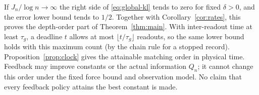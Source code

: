 If $J_n/\log n\to\infty$ the right side of \eqref{eq:global-kl} tends to zero
for fixed $\delta>0$, and the error lower bound tends to $1/2$. Together with
Corollary~\ref{cor:rates}, this proves the depth-order part of
Theorem~\ref{thm:main}. With inter-readout time at least $\tau_g$, a deadline
$t$ allows at most $\lfloor t/\tau_g\rfloor$ readouts, so the same lower bound
holds with this maximum count (by the chain rule for a stopped record).
Proposition~\ref{prop:clock} gives the attainable matching order in physical
time. Feedback may improve constants or the actual information $Q_n$; it
cannot change this order under the fixed force bound and observation model.
No claim that every feedback policy attains the best constant is made.

